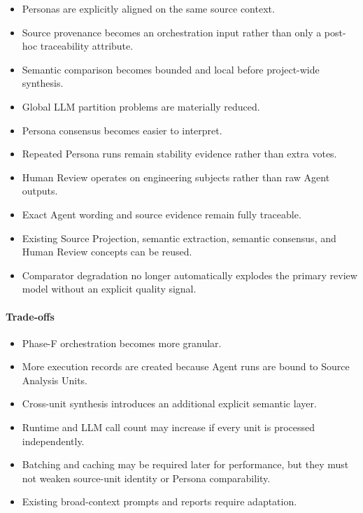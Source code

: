 \begin{itemize}
\tightlist
\item
  Personas are explicitly aligned on the same source context.
\item
  Source provenance becomes an orchestration input rather than only a post-hoc traceability attribute.
\item
  Semantic comparison becomes bounded and local before project-wide synthesis.
\item
  Global LLM partition problems are materially reduced.
\item
  Persona consensus becomes easier to interpret.
\item
  Repeated Persona runs remain stability evidence rather than extra votes.
\item
  Human Review operates on engineering subjects rather than raw Agent outputs.
\item
  Exact Agent wording and source evidence remain fully traceable.
\item
  Existing Source Projection, semantic extraction, semantic consensus, and Human Review concepts can be reused.
\item
  Comparator degradation no longer automatically explodes the primary review model without an explicit quality signal.
\end{itemize}

\hypertarget{trade-offs-5}{%
\paragraph{Trade-offs}\label{trade-offs-5}}

\begin{itemize}
\tightlist
\item
  Phase-F orchestration becomes more granular.
\item
  More execution records are created because Agent runs are bound to Source Analysis Units.
\item
  Cross-unit synthesis introduces an additional explicit semantic layer.
\item
  Runtime and LLM call count may increase if every unit is processed independently.
\item
  Batching and caching may be required later for performance, but they must not weaken source-unit identity or Persona comparability.
\item
  Existing broad-context prompts and reports require adaptation.
\end{itemize}

